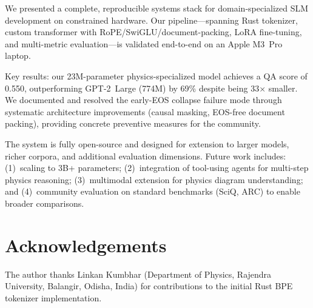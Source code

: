 \documentclass[11pt]{article}
\begin{document}
We presented a complete, reproducible systems stack for domain-specialized SLM development on constrained hardware. Our pipeline---spanning Rust tokenizer, custom transformer with RoPE/SwiGLU/document-packing, LoRA fine-tuning, and multi-metric evaluation---is validated end-to-end on an Apple M3~Pro laptop.

Key results: our 23M-parameter physics-specialized model achieves a QA score of 0.550, outperforming GPT-2~Large (774M) by 69\% despite being 33$\times$ smaller. We documented and resolved the early-EOS collapse failure mode through systematic architecture improvements (causal masking, EOS-free document packing), providing concrete preventive measures for the community.

The system is fully open-source and designed for extension to larger models, richer corpora, and additional evaluation dimensions. Future work includes: (1)~scaling to 3B+ parameters; (2)~integration of tool-using agents for multi-step physics reasoning; (3)~multimodal extension for physics diagram understanding; and (4)~community evaluation on standard benchmarks (SciQ, ARC) to enable broader comparisons.

\section*{Acknowledgements}

The author thanks Linkan Kumbhar (Department of Physics, Rajendra University, Balangir, Odisha, India) for contributions to the initial Rust BPE tokenizer implementation.
\end{document}
